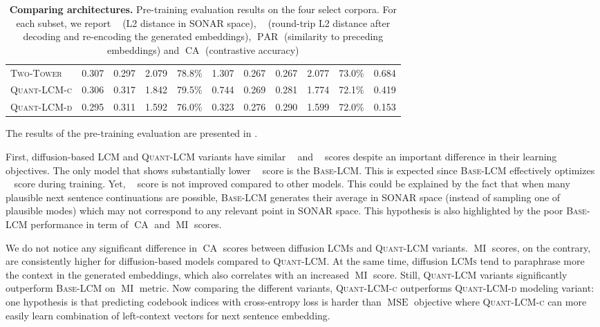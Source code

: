 \documentclass[twoside,11pt]{fairmeta}
\newcommand{\sonar}{\textsc{SONAR}\xspace}
\newcommand{\lcm}{\textsc{LCM}\xspace}
\newcommand{\lcms}{\textsc{LCMs}\xspace}
\newcommand{\twotower}{\textsc{Two-Tower}\xspace}
\newcommand{\mselcm}{\textsc{Base-LCM}\xspace}
\newcommand{\qlcm}{\textsc{Quant-LCM}\xspace}
\newcommand{\qlcmd}{\textsc{Quant-LCM-d}\xspace}
\newcommand{\qlcmc}{\textsc{Quant-LCM-c}\xspace}
\DeclareMathOperator{\mse}{MSE}
\DeclareMathOperator{\ltwo}{\ell_2}
\DeclareMathOperator{\ltworound}{\ell_{2-\text{r}}}
\DeclareMathOperator{\paraphrasing}{PAR}
\DeclareMathOperator{\mseacc}{CA}
\DeclareMathOperator{\mutinfo}{MI}
\begin{document}
\begin{table}[hbtp!]
\begin{tabular}{llllll|lllll}
        \twotower & 0.307 & 0.297 & 2.079 & 78.8\% & 1.307 &
        0.267 & 0.267 & 2.077 & 73.0\% & 0.684 \\
        \qlcmc  & 0.306 & 0.317 & 1.842 & 79.5\% & 0.744 & 
        0.269 & 0.281 & 1.774 & 72.1\% & 0.419 \\
        \qlcmd   & 0.295 & 0.311 & 1.592 & 76.0\% & 0.323 &
        0.276 & 0.290 & 1.599 & 72.0\% & 0.153\\
        \bottomrule
    \end{tabular}
    \caption{\textbf{Comparing architectures.} Pre-training evaluation results on the four select corpora. For each subset, we report $\ltwo$ (L2 distance in \sonar space), $\ltworound$ (round-trip L2 distance after decoding and re-encoding the generated embeddings), $\paraphrasing$ (similarity to preceding embeddings) and $\mseacc$ (contrastive accuracy)}
    \label{tab:ablation_results_nsp}
\end{table}

The results of the pre-training evaluation are presented in .

First, diffusion-based \lcm and \qlcm variants have similar $\ltwo$ and $\ltworound$ scores despite an important difference in their learning objectives. 
The only model that shows substantially lower $\ltwo$ score is the \mselcm. 
This is expected since \mselcm effectively optimizes $\ltwo$ score during training. 
Yet, $\ltworound$ score is not improved compared to other models.
This could be explained by the fact that when many plausible next sentence continuations are possible, \mselcm generates their average in SONAR space (instead of sampling one of plausible modes) which may not correspond to any relevant point in \sonar space.
This hypothesis is also highlighted by the poor \mselcm performance in term of $\mseacc$ and $\mutinfo$ scores.

We do not notice any significant difference in $\mseacc$ scores between diffusion \lcms and \qlcm variants. $\mutinfo$ scores, on the contrary, are consistently higher for diffusion-based models compared to \qlcm. At the same time, diffusion \lcms tend to paraphrase more the context in the generated embeddings, which also correlates with an increased $\mutinfo$ score.
Still, \qlcm variants significantly outperform \mselcm on $\mutinfo$ metric.
Now comparing the different variants, \qlcmc outperforms \qlcmd modeling variant: one hypothesis is that predicting codebook indices with cross-entropy loss is harder than $\mse$ objective where \qlcmc can more easily learn combination of left-context vectors for next sentence embedding.
\end{document}
